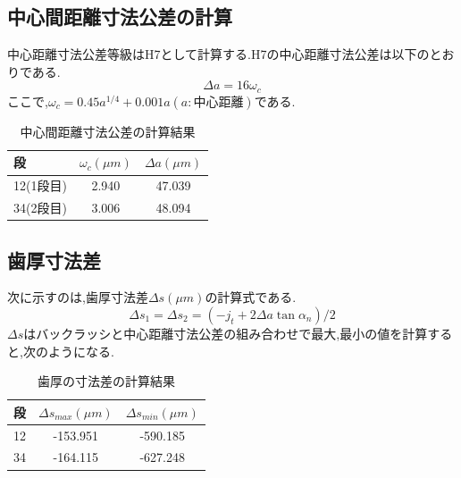 \documentclass[a4j,twoside,openright,11pt]{jreport}
\begin{document}
\subsection{中心間距離寸法公差の計算}
中心距離寸法公差等級はH7として計算する.H7の中心距離寸法公差は以下のとおりである.
\begin{equation}
\Delta a=16 \omega_c
\end{equation}
ここで,$\omega_c = 0.45a^{1/4}+0.001a (a:中心距離)$である.
\begin{table}[htb]
\begin{center}
  \caption{中心間距離寸法公差の計算結果}
  \begin{tabular}{|l||c|c|} \hline
段 &$\omega_c(\mu m)$&$\Delta a(\mu m)$\\\hline
12(1段目)&2.940&47.039\\
34(2段目)&3.006&48.094\\
\hline
  \end{tabular}
\end{center}
\end{table}

\subsection{歯厚寸法差}
次に示すのは,歯厚寸法差$\Delta s(\mu m)$の計算式である.
\begin{equation}
\Delta s_1 = \Delta s_2 =(-j_t + 2\Delta a \tan \alpha_n)/2 \nonumber
\end{equation}
$\Delta s$はバックラッシと中心距離寸法公差の組み合わせで最大,最小の値を計算すると,次のようになる.
\begin{table}[htb]
\begin{center}
  \caption{歯厚の寸法差の計算結果}
  \begin{tabular}{|l||c|c|} \hline
段    &$\Delta s_{max}(\mu m)$	&$\Delta s_{min}(\mu m)$\\\hline
12    &-153.951	&-590.185\\
34    &-164.115	&-627.248\\\hline
  \end{tabular}
\end{center}
\end{table}
\end{document}
